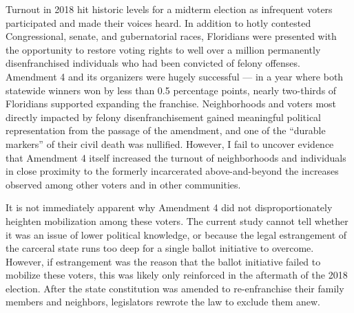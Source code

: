 \documentclass[
  12pt,
]{article}
\begin{document}
Turnout in 2018 hit historic levels for a midterm election as infrequent voters participated and made their voices heard. In addition to hotly contested Congressional, senate, and gubernatorial races, Floridians were presented with the opportunity to restore voting rights to well over a million permanently disenfranchised individuals who had been convicted of felony offenses. Amendment 4 and its organizers were hugely successful --- in a year where both statewide winners won by less than 0.5 percentage points, nearly two-thirds of Floridians supported expanding the franchise. Neighborhoods and voters most directly impacted by felony disenfranchisement gained meaningful political representation from the passage of the amendment, and one of the ``durable markers'' of their civil death was nullified. However, I fail to uncover evidence that Amendment 4 itself increased the turnout of neighborhoods and individuals in close proximity to the formerly incarcerated above-and-beyond the increases observed among other voters and in other communities.

It is not immediately apparent why Amendment 4 did not disproportionately heighten mobilization among these voters. The current study cannot tell whether it was an issue of lower political knowledge, or because the legal estrangement of the carceral state runs too deep for a single ballot initiative to overcome. However, if estrangement was the reason that the ballot initiative failed to mobilize these voters, this was likely only reinforced in the aftermath of the 2018 election. After the state constitution was amended to re-enfranchise their family members and neighbors, legislators rewrote the law to exclude them anew.
\end{document}
